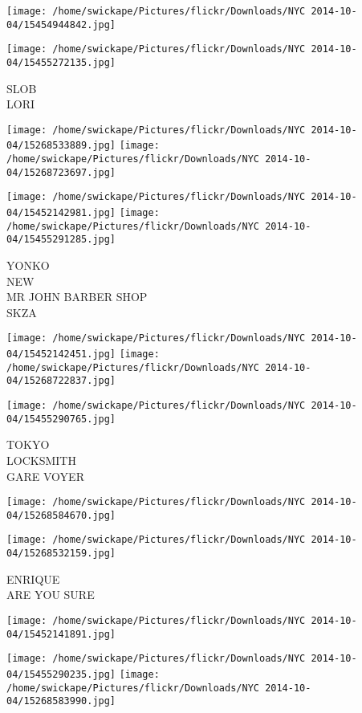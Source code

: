 \documentclass[10pt,letterpaper]{article}
\begin{document}
\texttt{[image: /home/swickape/Pictures/flickr/Downloads/NYC 2014-10-04/15454944842.jpg]}

\vspace{0.25in}
\texttt{[image: /home/swickape/Pictures/flickr/Downloads/NYC 2014-10-04/15455272135.jpg]}

SLOB\\
LORI\\
\pagebreak

\texttt{[image: /home/swickape/Pictures/flickr/Downloads/NYC 2014-10-04/15268533889.jpg]}
\texttt{[image: /home/swickape/Pictures/flickr/Downloads/NYC 2014-10-04/15268723697.jpg]}

\texttt{[image: /home/swickape/Pictures/flickr/Downloads/NYC 2014-10-04/15452142981.jpg]}
\texttt{[image: /home/swickape/Pictures/flickr/Downloads/NYC 2014-10-04/15455291285.jpg]}

YONKO\\
NEW\\
MR JOHN BARBER SHOP\\
SKZA\\
\pagebreak

\texttt{[image: /home/swickape/Pictures/flickr/Downloads/NYC 2014-10-04/15452142451.jpg]}
\texttt{[image: /home/swickape/Pictures/flickr/Downloads/NYC 2014-10-04/15268722837.jpg]}

\texttt{[image: /home/swickape/Pictures/flickr/Downloads/NYC 2014-10-04/15455290765.jpg]}

TOKYO\\
LOCKSMITH\\
GARE VOYER\\
\pagebreak

\texttt{[image: /home/swickape/Pictures/flickr/Downloads/NYC 2014-10-04/15268584670.jpg]}

\vspace{0.25in}
\texttt{[image: /home/swickape/Pictures/flickr/Downloads/NYC 2014-10-04/15268532159.jpg]}

ENRIQUE\\
ARE YOU SURE\\
\pagebreak

\texttt{[image: /home/swickape/Pictures/flickr/Downloads/NYC 2014-10-04/15452141891.jpg]}

\vspace{0.25in}
\texttt{[image: /home/swickape/Pictures/flickr/Downloads/NYC 2014-10-04/15455290235.jpg]}
\texttt{[image: /home/swickape/Pictures/flickr/Downloads/NYC 2014-10-04/15268583990.jpg]}
\end{document}
